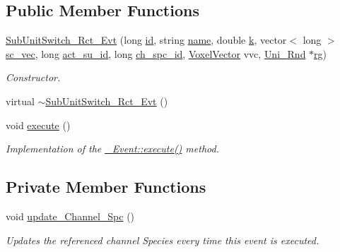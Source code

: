 \subsection*{Public Member Functions}
\begin{DoxyCompactItemize}
\item 
\hyperlink{classnw_1_1_sub_unit_switch___rct___evt_a77796138fe4514288417f95dcc053f79}{Sub\+Unit\+Switch\+\_\+\+Rct\+\_\+\+Evt} (long \hyperlink{classnw_1_1___event_a8f7ce287f596266dd763ec7db2f74090}{id}, string \hyperlink{classnw_1_1___event_ab4f50a54039cd4957bdca55049178562}{name}, double \hyperlink{classnw_1_1___event_afca0ae816e9834add07db8e9a6618faa}{k}, vector$<$ long $>$ \hyperlink{classnw_1_1___event_a560c8b6f9954a43f5d5f80204473b64d}{sc\+\_\+vec}, long \hyperlink{classnw_1_1_sub_unit_switch___rct___evt_a3f14cca01fc1645696666330a7354865}{act\+\_\+su\+\_\+id}, long \hyperlink{classnw_1_1_sub_unit_switch___rct___evt_a7d1c65995bc49d7e6e625aa090325af1}{ch\+\_\+spc\+\_\+id}, \hyperlink{namespacenw_ad7146b8b5a9de9be416847f41135722c}{Voxel\+Vector} vvc, \hyperlink{classnw_1_1_uni___rnd}{Uni\+\_\+\+Rnd} $\ast$\hyperlink{classnw_1_1___event_af92482aeea55562560573ecccd5ab108}{rg})
\begin{DoxyCompactList}\small\item\em Constructor. \end{DoxyCompactList}\item 
virtual \hyperlink{classnw_1_1_sub_unit_switch___rct___evt_a054845f5f9892951bfe04ffd57563243}{$\sim$\+Sub\+Unit\+Switch\+\_\+\+Rct\+\_\+\+Evt} ()
\item 
void \hyperlink{classnw_1_1_sub_unit_switch___rct___evt_ab89891fae9287edc9d9a215788706093}{execute} ()
\begin{DoxyCompactList}\small\item\em Implementation of the \hyperlink{classnw_1_1___event_aa022418fb765582a053ac75cbc3436d6}{\+\_\+\+Event\+::execute()} method. \end{DoxyCompactList}\end{DoxyCompactItemize}
\subsection*{Private Member Functions}
\begin{DoxyCompactItemize}
\item 
void \hyperlink{classnw_1_1_sub_unit_switch___rct___evt_a616d644628a7b4ada1c64733c601354f}{update\+\_\+\+Channel\+\_\+\+Spc} ()
\begin{DoxyCompactList}\small\item\em Updates the referenced channel Species every time this event is executed. \end{DoxyCompactList}\end{DoxyCompactItemize}
